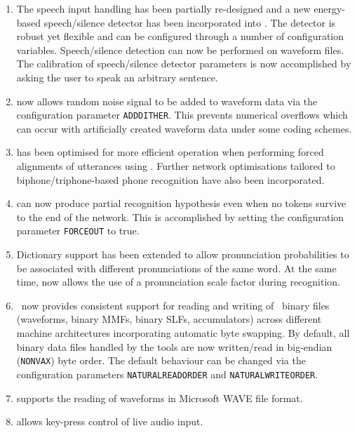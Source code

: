 \begin{enumerate}

\item The speech input handling has been partially re-designed and a new 
energy-based speech/silence detector has been incorporated into .
The detector is robust yet flexible and can be configured through a number of
configuration variables. Speech/silence detection can now be performed on
waveform files. The calibration of speech/silence detector parameters is now
accomplished by asking the user to speak an arbitrary sentence.

\item {} now allows random noise signal to be added to waveform
data via the configuration parameter \texttt{ADDDITHER}. This prevents
numerical overflows which can occur with artificially created waveform data
under some coding schemes.

\item {} has been optimised for more efficient operation when
performing forced alignments of utterances using . Further
network optimisations tailored to biphone/triphone-based phone recognition 
have also been incorporated.

\item {} can now produce partial recognition hypothesis even when 
no tokens survive to the end of the network. This is accomplished by setting
the  configuration parameter \texttt{FORCEOUT} to true.

\item Dictionary support has been extended to allow pronunciation probabilities
to be associated with different pronunciations of the same word. At the same
time,  now allows the use of a pronunciation scale factor during
recognition.

\item \HTK\ now provides consistent support for reading and writing of \HTK\ 
binary files (waveforms, binary MMFs, binary SLFs,  accumulators)
across different machine architectures incorporating automatic byte swapping.
By default, all binary data files handled by the tools are now written/read in
big-endian (\texttt{NONVAX}) byte order. The default behaviour can be changed
via the configuration parameters \texttt{NATURALREADORDER} and
\texttt{NATURALWRITEORDER}.

\item {} supports the reading of waveforms in Microsoft WAVE file
format.

\item {} allows key-press control of live audio input.

\end{enumerate}



